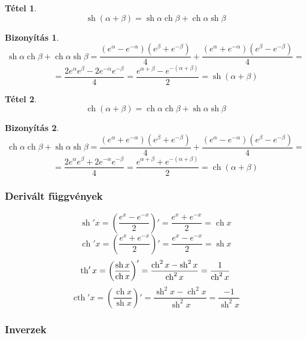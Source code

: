 \documentclass[a4paper,12pt,twoside]{book}
\DeclareMathOperator{\sh}{sh} %
\DeclareMathOperator{\ch}{ch} %
\renewcommand{\th}{\qopname\relax o{th}}
\DeclareMathOperator{\cth}{cth}
\newtheorem{tetel}{Tétel}[chapter]
\theoremstyle{break}
\newtheorem{biz}{Bizonyítás}[chapter]
\theoremstyle{plain}
\begin{document}
\begin{tetel}
\[\boxed{\sh(\alpha+\beta) = \sh\alpha\ch\beta + \ch\alpha\sh\beta}\]
\end{tetel}

\begin{biz}
\[\sh\alpha\ch\beta + \ch\alpha\sh\beta = \frac{(e^\alpha-e^{-\alpha})(e^\beta+e^{-\beta})}{4} + \frac{(e^\alpha+e^{-\alpha})(e^\beta-e^{-\beta})}{4} = \]
\[ = \frac{2e^\alpha e^\beta - 2e^{-\alpha} e^{-\beta}}{4} = \frac{e^{\alpha+\beta} - e^{-(\alpha+\beta)}}{2} = \sh(\alpha+\beta)\]
\end{biz}

\begin{tetel}
\[\boxed{\ch(\alpha+\beta) = \ch\alpha\ch\beta + \sh\alpha\sh\beta}\]
\end{tetel}
\begin{biz}
\[\ch\alpha\ch\beta + \sh\alpha\sh\beta = \frac{(e^\alpha+e^{-\alpha})(e^\beta+e^{-\beta})}{4}  +\frac{(e^\alpha-e^{-\alpha})(e^\beta-e^{-\beta})}{4} = \]
\[ = \frac{2e^\alpha e^\beta + 2e^{-\alpha} e^{-\beta}}{4} = \frac{e^{\alpha+\beta} + e^{-(\alpha+\beta)}}{2} = \ch(\alpha+\beta)\]
\end{biz}

\subsubsection{Derivált függvények}

\[\sh' x = \left(\dfrac{e^x-e^{-x}}{2}\right)' = \dfrac{e^x+e^{-x}}{2} = \ch x\]
\[\ch' x = \left(\dfrac{e^x+e^{-x}}{2}\right)' = \dfrac{e^x-e^{-x}}{2} = \sh x\]
\[\th' x = \left(\frac{\sh x}{\ch x}\right)' = \frac{\ch^2 x-\sh^2 x}{\ch^2 x} = \frac{1}{\ch^2 x}\]
\[\cth' x = \left(\frac{\ch x}{\sh x}\right)' = \frac{\sh^2 x-\ch^2 x}{\sh^2 x} = \frac{-1}{\sh^2 x}\]

\subsubsection{Inverzek}
\end{document}
